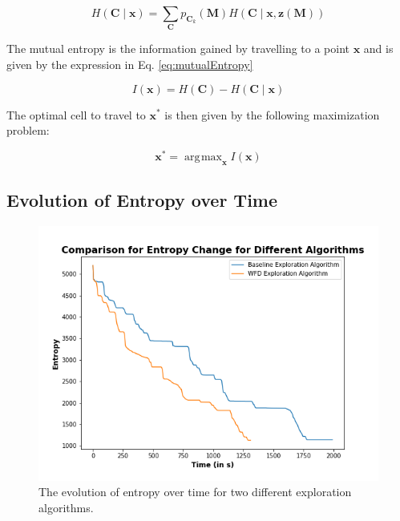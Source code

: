 \documentclass[a4paper,12pt]{article}
\DeclareMathOperator*{\argmax}{\arg\!\max}
\begin{document}
			\begin{equation}
				H(\textbf{C}\mid\textbf{x}) = \sum_{\textbf{C}} p_{\textbf{C}_k}(\textbf{M})H(\textbf{C}\mid\textbf{x},\textbf{z}(\textbf{M}))
				\label{eq:expectedMapEntropy}
			\end{equation}

			The mutual entropy is the information gained by travelling to a point $\textbf{x}$ and is given by the expression in Eq. \ref{eq:mutualEntropy}

			\begin{equation}
				I(\textbf{x}) = H \left(\textbf{C}\right) - H(\textbf{C}\mid\textbf{x})
				\label{eq:mutualEntropy}
			\end{equation}

			The optimal cell to travel to $\textbf{x}^{*}$ is then given by the following maximization problem:

			\begin{equation}
				\textbf{x}^{*} = \argmax_{\textbf{x}}I(\textbf{x})
				\label{eq:optimalCell}
			\end{equation}

		\subsection{Evolution of Entropy over Time}

			\begin{figure}[H]
				\centering
				\includegraphics[scale=0.5]{images/EntropyChange.png}
				\caption{The evolution of entropy over time for two different exploration algorithms.}
				\label{EntropyChange}
			\end{figure}
\end{document}
